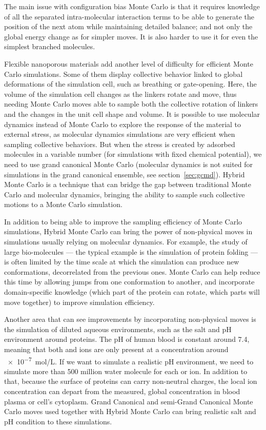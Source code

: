 \documentclass[thesis]{subfiles}
\begin{document}
The main issue with configuration bias Monte Carlo is that it requires
knowledge of all the separated intra-molecular interaction terms to be able to
generate the position of the next atom while maintaining detailed balance; and
not only the global energy change as for simpler moves. It is also harder to use
it for even the simplest branched molecules.

Flexible nanoporous materials add another level of difficulty for efficient
Monte Carlo simulations. Some of them display collective behavior linked to
global deformations of the simulation cell, such as breathing or gate-opening.
Here, the volume of the simulation cell changes as the linkers rotate and move,
thus needing Monte Carlo moves able to sample both the collective rotation of
linkers and the changes in the unit cell shape and volume. It is possible to use
molecular dynamics instead of Monte Carlo to explore the response of the
material to external stress, as molecular dynamics simulations are very
efficient when sampling collective behaviors. But when the stress is created by
adsorbed molecules in a variable number (for simulations with fixed chemical
potential), we need to use grand canonical Monte Carlo (molecular dynamics is
not suited for simulations in the grand canonical ensemble, see
section~\ref{sec:gcmd}). Hybrid Monte Carlo is a technique that can bridge the
gap between traditional Monte Carlo and molecular dynamics, bringing the ability
to sample such collective motions to a Monte Carlo simulation\cite{Rogge2019}.

In addition to being able to improve the sampling efficiency of Monte Carlo
simulations, Hybrid Monte Carlo can bring the power of non-physical moves in
simulations usually relying on molecular dynamics. For example, the study of
large bio-molecules --- the typical example is the simulation of protein folding
--- is often limited by the time scale at which the simulation can produce new
conformations, decorrelated from the previous ones\cite{Izaguirre2004}. Monte
Carlo can help reduce this time by allowing jumps from one conformation to
another, and incorporate domain-specific knowledge (which part of the protein
can rotate, which parts will move together) to improve simulation efficiency.

Another area that can see improvements by incorporating non-physical moves is
the simulation of diluted aqueous environments, such as the salt and pH
environment around proteins. The pH of human blood is constant around 7.4,
meaning that both  and  ions are only present at a concentration
around \SI{e-7}{mol/L}. If we want to simulate a realistic pH environment, we
need to simulate more than 500 million water molecule for each  or
 ion. In addition to that, because the surface of proteins can carry
non-neutral charges, the local ion concentration can depart from the measured,
global concentration in blood plasma or cell's cytoplasm. Grand Canonical and
semi-Grand Canonical Monte Carlo moves used together with Hybrid Monte Carlo can
bring realistic salt and pH condition to these simulations\cite{Ross2018}.
\end{document}
